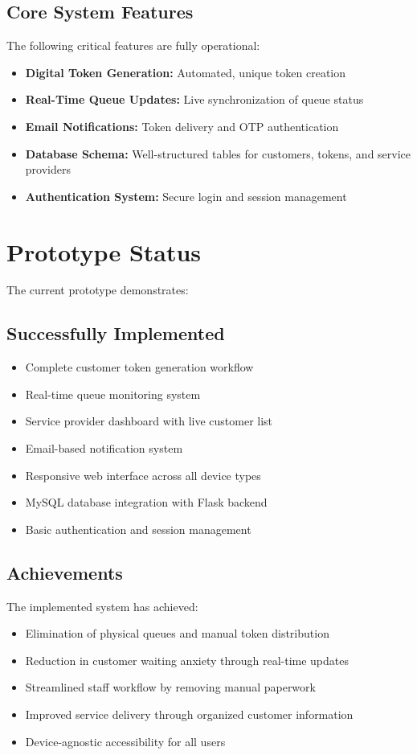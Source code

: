 \documentclass[12pt,a4paper]{report}
\begin{document}
\subsection{Core System Features}
The following critical features are fully operational:
\begin{itemize}
    \item \textbf{Digital Token Generation:} Automated, unique token creation
    \item \textbf{Real-Time Queue Updates:} Live synchronization of queue status
    \item \textbf{Email Notifications:} Token delivery and OTP authentication
    \item \textbf{Database Schema:} Well-structured tables for customers, tokens, and service providers
    \item \textbf{Authentication System:} Secure login and session management
\end{itemize}

\section{Prototype Status}

The current prototype demonstrates:

\subsection{Successfully Implemented}
\begin{itemize}
    \item Complete customer token generation workflow
    \item Real-time queue monitoring system
    \item Service provider dashboard with live customer list
    \item Email-based notification system
    \item Responsive web interface across all device types
    \item MySQL database integration with Flask backend
    \item Basic authentication and session management
\end{itemize}

\subsection{Achievements}
The implemented system has achieved:
\begin{itemize}
    \item Elimination of physical queues and manual token distribution
    \item Reduction in customer waiting anxiety through real-time updates
    \item Streamlined staff workflow by removing manual paperwork
    \item Improved service delivery through organized customer information
    \item Device-agnostic accessibility for all users
\end{itemize}
\end{document}
